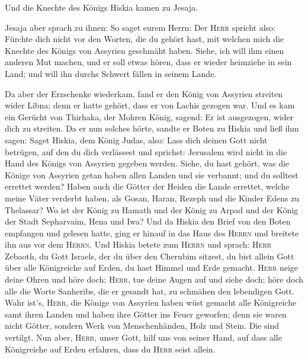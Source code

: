  Und die Knechte des Königs Hiskia kamen zu Jesaja.

 Jesaja aber sprach zu ihnen: So saget eurem Herrn: Der
\textsc{Herr} spricht also: Fürchte dich nicht vor den Worten, die du
gehört hast, mit welchen mich die Knechte des Königs von Assyrien
geschmäht haben.  Siehe, ich will ihm einen anderen Mut
machen, und er soll etwas hören, dass er wieder heimziehe in sein Land;
und will ihn durchs Schwert fällen in seinem Lande.

 Da aber der Erzschenke wiederkam, fand er den König von
Assyrien streiten wider Libna; denn er hatte gehört, dass er von Lachis
gezogen war.  Und es kam ein Gerücht von Thirhaka, der
Mohren König, sagend: Er ist ausgezogen, wider dich zu streiten.
 Da er nun solches hörte, sandte er Boten zu Hiskia und
ließ ihm sagen: Saget Hiskia, dem König Judas, also: Lass dich deinen
Gott nicht betrügen, auf den du dich verlässest und sprichst: Jerusalem
wird nicht in die Hand des Königs von Assyrien gegeben werden.
 Siehe, du hast gehört, was die Könige von Assyrien getan
haben allen Landen und sie verbannt; und du solltest errettet werden?
 Haben auch die Götter der Heiden die Lande errettet,
welche meine Väter verderbt haben, als Gosan, Haran, Rezeph und die
Kinder Edens zu Thelassar?  Wo ist der König zu Hamath
und der König zu Arpad und der König der Stadt Sepharvaim, Hena und Iwa?
 Und da Hiskia den Brief von den Boten empfangen und
gelesen hatte, ging er hinauf in das Haus des \textsc{Herrn} und
breitete ihn aus vor dem \textsc{Herrn}.  Und Hiskia
betete zum \textsc{Herrn} und sprach:  \textsc{Herr}
Zebaoth, du Gott Israels, der du über den Cherubim sitzest, du bist
allein Gott über alle Königreiche auf Erden, du hast Himmel und Erde
gemacht.  \textsc{Herr} neige deine Ohren und höre doch;
\textsc{Herr}, tue deine Augen auf und siehe doch; höre doch alle die
Worte Sanheribs, die er gesandt hat, zu schmähen den lebendigen Gott.
 Wahr ist's, \textsc{Herr}, die Könige von Assyrien haben
wüst gemacht alle Königreiche samt ihren Landen  und
haben ihre Götter ins Feuer geworfen; denn sie waren nicht Götter,
sondern Werk von Menschenhänden, Holz und Stein. Die sind vertilgt.
 Nun aber, \textsc{Herr}, unser Gott, hilf uns von seiner
Hand, auf dass alle Königreiche auf Erden erfahren, dass du
\textsc{Herr} seist allein.

